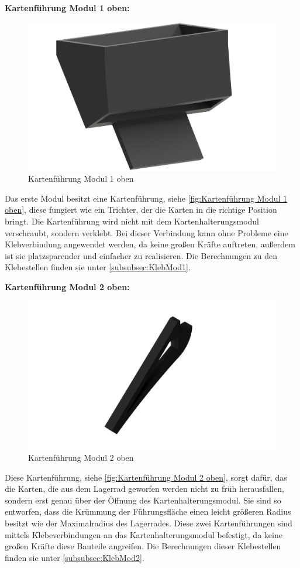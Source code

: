 \textbf{Kartenführung Modul 1 oben:}

\begin{figure}
    \includegraphics[width=8 cm]{fig/mech/KarteneinlaufNeu}
    \caption{Kartenführung Modul 1 oben}
    \label{fig:Kartenführung Modul 1 oben}
\end{figure}
Das erste Modul besitzt eine Kartenführung, siehe \autoref{fig:Kartenführung Modul 1 oben}, diese fungiert wie ein Trichter, der die Karten in die richtige Position bringt.
Die Kartenführung wird nicht mit dem Kartenhalterungsmodul verschraubt, sondern
verklebt. Bei dieser Verbindung kann ohne Probleme eine Klebverbindung angewendet werden, da keine großen Kräfte auftreten, außerdem
ist sie platzsparender und einfacher zu realisieren. Die Berechnungen zu den Klebestellen finden sie unter \autoref{subsubsec:KlebMod1}.

\pagebreak
\textbf{Kartenführung Modul 2 oben:}

\begin{figure}
    \includegraphics[width=7 cm]{fig/mech/StopperOben}
    \caption{Kartenführung Modul 2 oben}
    \label{fig:Kartenführung Modul 2 oben}
\end{figure}
Diese Kartenführung, siehe \autoref{fig:Kartenführung Modul 2 oben}, sorgt dafür, das die Karten, die aus dem Lagerrad geworfen werden nicht zu früh herausfallen,
sondern erst genau über der Öffnung des Kartenhalterungsmodul. Sie sind so entworfen, dass die Krümmung der Führungsfläche einen leicht
größeren Radius besitzt wie der Maximalradius des Lagerrades. Diese zwei Kartenführungen sind mittels Klebeverbindungen
an das Kartenhalterungsmodul befestigt, da keine großen Kräfte diese Bauteile angreifen. Die Berechnungen dieser Klebestellen finden sie unter \autoref{subsubsec:KlebMod2}. \\



